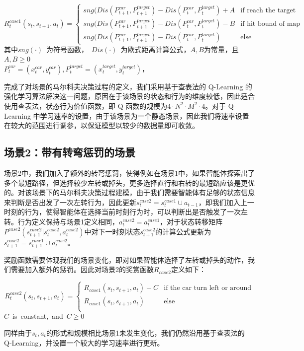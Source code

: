 \documentclass{standalone}
\begin{document}
\begin{center}
    \begin{equation}
    \label{rewardcase1}
    R_t^{case1}(s_t, s_{t+1}, a_t) = \begin{cases}
     sng(Dis(P_{t+1}^{car}, P_{t+1}^{target}) - Dis(P_{t}^{car}, P_{t}^{target}) + A &\mbox{if reach the target}\\
     sng(Dis(P_{t+1}^{car}, P_{t+1}^{target}) - Dis(P_{t}^{car}, P_{t}^{target}) - B &\mbox{if hit bound of map}\\
     sng(Dis(P_{t+1}^{car}, P_{t+1}^{target}) - Dis(P_{t}^{car}, P_{t}^{target}) &\mbox{else}
     \end{cases}
    \end{equation}
    \mbox{其中$sng(\cdot)$ 为符号函数， $Dis(\cdot)$ 为欧式距离计算公式，$A,B$为常量，且$A, B \geq 0$}\\
    \mbox{$P_{t}^{car} = (x_t^{car}, y_t^{car}), P_{t}^{target} = (x^{target}_t, y^{target}_t)$，}
\end{center}

完成了对场景的马尔科夫决策过程的定义，我们采用基于查表法的 Q-Learning 的强化学习算法解决这一问题，原因在于该场景的状态和行为的维度较低，因此适合使用查表法，状态行为价值函数，即 Q 函数的规模为$4\cdot N^2\cdot M^2 \cdot 4$。对于 Q-Learning 中学习速率的设置，由于该场景为一个静态场景，因此我们将速率设置在较大的范围进行调参，以保证模型以较少的数据量即可收敛。
\subsection{场景2：带有转弯惩罚的场景}
场景2中，我们加入了额外的转弯惩罚，使得例如在场景1中，如果智能体探索出了多个最短路径，但选择较少左转或掉头，更多选择直行和右转的最短路应该是更优的。对该场景下的马尔科夫决策过程建模，由于我们需要智能体有足够的状态信息来判断是否出发了一次左转行为，因此更新$s_t^{case2}=s_t^{case1}\cup a_{t-1}$，即我们加入上一时刻的行为，使得智能体在选择当前时刻行为时，可以判断出是否触发了一次左转。行为定义保持与场景1定义相同，$a_t^{case2} = a_t^{case1}$，对于状态转移矩阵$P^{case2}(s_{t+1}^{case2}|s_t^{case2}, a_t^{case2})$中对下一时刻状态$s_{t+1}^{case2}$的计算公式更新为$s_{t+1}^{case2} = s_{t+1}^{case1} \cup a_t^{case2}$。\par
奖励函数需要体现我们的场景变化，即对如果智能体选择了左转或掉头的动作，我们需要加入额外的惩罚。因此对场景2的奖赏函数$R_{case2}$定义如下：
\begin{center}
    \begin{equation}
    \label{eq2reward}
    R_t^{case2}(s_t, s_{t+1}, a_t) = \begin{cases}
     R_{case1}(s_t, s_{t+1}, a_t) - C &\mbox{if the car turn left or around}\\
     R_{case1}(s_t, s_{t+1}, a_t) &\mbox{else}\\
     \end{cases}
    \end{equation}
   \mbox{$C$ is constant, and $C \geq 0$}

\end{center}
同样由于$s_t, a_t$的形式和规模相比场景1未发生变化，我们仍然沿用基于查表法的 Q-Learning，并设置一个较大的学习速率进行更新。
\end{document}
